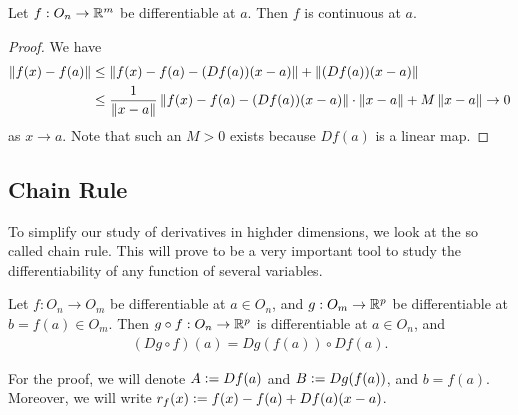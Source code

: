 \begin{remark}
    Let $f:O_{n} \to \mathbb{R}^{m}$ be differentiable at $a$. Then $f$ is continuous at $a$.
\end{remark}
\begin{proof}
    We have
    \begin{align}
        \left\lVert f(x)-f(a)\right\rVert &\leq \left\lVert f(x)-f(a)-(Df(a))(x-a)\right\rVert + \left\lVert(Df(a))(x-a)\right\rVert \notag \\
        &\leq \frac{1}{\left\lVert x-a\right\rVert} \left\lVert f(x)-f(a)-(Df(a))(x-a)\right\rVert \cdot \left\lVert x-a\right\rVert + M\left\lVert x-a\right\rVert \to 0
    \end{align}
    as $x \to a$. Note that such an $M > 0$ exists because $Df(a)$ is a linear map.
\end{proof}

\subsection{Chain Rule}

To simplify our study of derivatives in highder dimensions, we look at the so called chain rule. This will prove to be a very important tool to study the differentiability of any function of several variables.

\begin{theorem}
    Let $f:O_{n} \to O_{m}$ be differentiable at $a \in O_{n}$, and $g:O_{m} \to \mathbb{R}^{p}$ be differentiable at $b = f(a) \in O_{m}$. Then $g \circ f:O_{n} \to \mathbb{R}^{p}$ is differentiable at $a \in O_{n}$, and
    \begin{align}
        (D g \circ f)(a) = Dg(f(a)) \circ Df(a).
    \end{align}
\end{theorem}

For the proof, we will denote $A \vcentcolon= Df(a)$ and $B \vcentcolon= Dg(f(a))$, and $b = f(a)$. Moreover, we will write $r_{f}(x) \vcentcolon= f(x)-f(a)+Df(a)(x-a)$.

